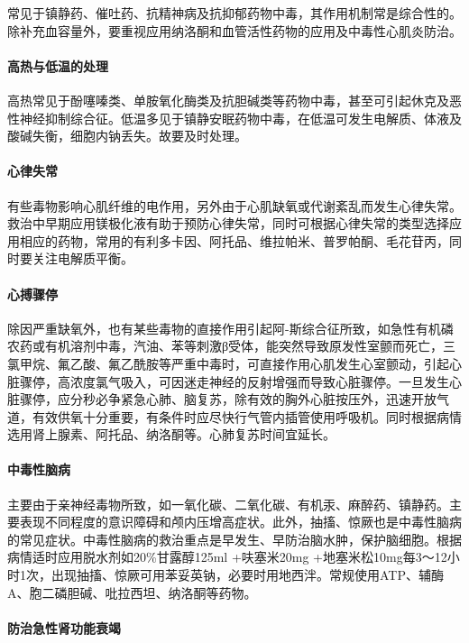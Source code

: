 常见于镇静药、催吐药、抗精神病及抗抑郁药物中毒，其作用机制常是综合性的。除补充血容量外，要重视应用纳洛酮和血管活性药物的应用及中毒性心肌炎防治。

\paragraph{高热与低温的处理}

高热常见于酚噻嗪类、单胺氧化酶类及抗胆碱类等药物中毒，甚至可引起休克及恶性神经抑制综合征。低温多见于镇静安眠药物中毒，在低温可发生电解质、体液及酸碱失衡，细胞内钠丢失。故要及时处理。

\paragraph{心律失常}

有些毒物影响心肌纤维的电作用，另外由于心肌缺氧或代谢紊乱而发生心律失常。救治中早期应用镁极化液有助于预防心律失常，同时可根据心律失常的类型选择应用相应的药物，常用的有利多卡因、阿托品、维拉帕米、普罗帕酮、毛花苷丙，同时要关注电解质平衡。

\paragraph{心搏骤停}

除因严重缺氧外，也有某些毒物的直接作用引起阿-斯综合征所致，如急性有机磷农药或有机溶剂中毒，汽油、苯等刺激β受体，能突然导致原发性室颤而死亡，三氯甲烷、氟乙酸、氟乙酰胺等严重中毒时，可直接作用心肌发生心室颤动，引起心脏骤停，高浓度氯气吸入，可因迷走神经的反射增强而导致心脏骤停。一旦发生心脏骤停，应分秒必争紧急心肺、脑复苏，除有效的胸外心脏按压外，迅速开放气道，有效供氧十分重要，有条件时应尽快行气管内插管使用呼吸机。同时根据病情选用肾上腺素、阿托品、纳洛酮等。心肺复苏时间宜延长。

\paragraph{中毒性脑病}

主要由于亲神经毒物所致，如一氧化碳、二氧化碳、有机汞、麻醉药、镇静药。主要表现不同程度的意识障碍和颅内压增高症状。此外，抽搐、惊厥也是中毒性脑病的常见症状。中毒性脑病的救治重点是早发生、早防治脑水肿，保护脑细胞。根据病情适时应用脱水剂如20\%甘露醇125ml
+呋塞米20mg
+地塞米松10mg每3～12小时1次，出现抽搐、惊厥可用苯妥英钠，必要时用地西泮。常规使用ATP、辅酶A、胞二磷胆碱、吡拉西坦、纳洛酮等药物。

\paragraph{防治急性肾功能衰竭}

